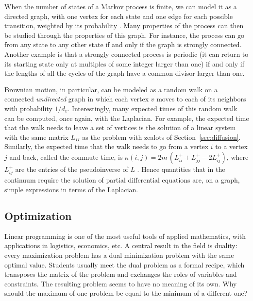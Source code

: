 \documentclass[11pt,a4paper]{article}
\theoremstyle{plain}
\theoremstyle{definition}
\begin{document}
When the number of states of a Markov process is finite, we can model it as a directed graph, with one vertex for each state and one edge for each possible transition, weighted by its probability \cite{levin2017}. Many properties of the process can then be studied through the properties of this graph. For instance, the process can go from any state to any other state if and only if the graph is strongly connected. Another example is that a strongly connected process is periodic (it can return to its starting state only at multiples of some integer larger than one) if and only if the lengths of all the cycles of the graph have a common divisor larger than one.

Brownian motion, in particular, can be modeled as a random walk on a connected \emph{undirected} graph in which each vertex $v$ moves to each of its neighbors with probability $1/d_v$. Interestingly, many expected times of this random walk can be computed, once again, with the Laplacian. For example, the expected time that the walk needs to leave a set of vertices is the solution of a linear system with the same matrix $L_{II}$ as the problem with zealots of Section~\ref{sec:diffusion}. Similarly, the expected time that the walk needs to go from a vertex $i$ to a vertex $j$ and back, called the commute time, is $\kappa(i,j)=2m\,(L^+_{ii}+L^+_{jj}-2L^+_{ij})$, where $L^+_{ij}$ are the entries of the pseudoinverse of $L$ \cite{chandra1996}. Hence quantities that in the continuum require the solution of partial differential equations are, on a graph, simple expressions in terms of the Laplacian.

\subsection{Optimization}

Linear programming is one of the most useful tools of applied mathematics, with applications in logistics,  economics, etc. A central result in the field is duality: every maximization problem has a dual minimization problem with the same optimal value. Students usually meet the dual problem as a formal recipe, which transposes the matrix of the problem and exchanges the roles of variables and constraints. The resulting problem seems to have no meaning of its own. Why should the maximum of one problem be equal to the minimum of a different one?
\end{document}
